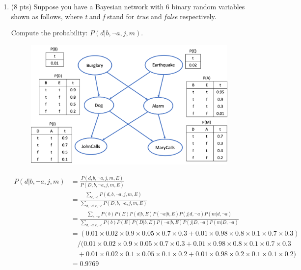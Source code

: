 \documentclass{article}
\newenvironment{soln}{
	\leavevmode\color{red}\ignorespaces
}{}
\begin{document}
\begin{enumerate}
\item (8 pts) Suppose you have a Bayesian network with 6 binary random variables shown as follows, where \emph{t} and \emph{f} stand for \emph{true} and \emph{false} respectively.

Compute the probability: $P(d | b, \neg a, j, m)$.

\begin{figure}[h]
\centering
\includegraphics[scale=0.5]{p1}
\label{fig:q1}
\end{figure}

\begin{soln}
\begin{equation}
\begin{split}
P(d|b,\neg a,j,m) & = \frac{P(d,b,\neg a,j,m,E)}{P(D,b,\neg a,j,m,E)}\\
&= \frac{\sum\limits_{e,\neg e}P(d,b,\neg a,j,m,E)}{\sum\limits_{d, \neg d, e,\neg e}P(D,b,\neg a,j,m,E)}\\
&= \frac{\sum\limits_{e,\neg e}P(b)P(E)P(d|b,E)P(\neg a|b,E)P(j|d,\neg a)P(m|d,\neg a)}{\sum\limits_{d, \neg d, e,\neg e}P(b)P(E)P(D|b,E)P(\neg a|b,E)P(j|D,\neg a)P(m|D,\neg a)}\\
&= (0.01\times0.02\times0.9\times0.05\times0.7\times0.3+0.01\times0.98\times0.8\times0.1\times0.7\times0.3)\\
&\quad/(0.01\times0.02\times0.9\times0.05\times0.7\times0.3+0.01\times0.98\times0.8\times0.1\times0.7\times0.3\\
&\quad+0.01\times0.02\times0.1\times0.05\times0.1\times0.2+0.01\times0.98\times0.2\times0.1\times0.1\times0.2)\\
&=0.9769
\end{split}
\end{equation}
\end{soln}


\end{enumerate}
\end{document}
